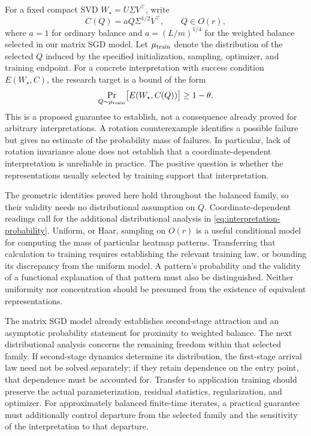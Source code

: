 For a fixed compact SVD $W_\star=U\Sigma V^\top$, write
\[
 C(Q)=aQ\Sigma^{1/2}V^\top,\qquad Q\in O(r),
\]
where $a=1$ for ordinary balance and $a=(L/m)^{1/4}$ for the weighted balance selected in our matrix SGD model. Let $\mu_{\rm train}$ denote the distribution of the selected $Q$ induced by the specified initialization, sampling, optimizer, and training endpoint. For a concrete interpretation with success condition $E(W_\star,C)$, the research target is a bound of the form
\begin{equation}\label{eq:interpretation-probability}
 \Pr_{Q\sim\mu_{\rm train}}
 \bigl[E(W_\star,C(Q))\bigr]\geq 1-\theta.
\end{equation}
This is a proposed guarantee to establish, not a consequence already proved for arbitrary interpretations. A rotation counterexample identifies a possible failure but gives no estimate of the probability mass of failures. In particular, lack of rotation invariance alone does not establish that a coordinate-dependent interpretation is unreliable in practice. The positive question is whether the representations usually selected by training support that interpretation.

The geometric identities proved here hold throughout the balanced family, so their validity needs no distributional assumption on $Q$. Coordinate-dependent readings call for the additional distributional analysis in \eqref{eq:interpretation-probability}. Uniform, or Haar, sampling on $O(r)$ is a useful conditional model for computing the mass of particular heatmap patterns. Transferring that calculation to training requires establishing the relevant training law, or bounding its discrepancy from the uniform model. A pattern's probability and the validity of a functional explanation of that pattern must also be distinguished. Neither uniformity nor concentration should be presumed from the existence of equivalent representations.

The matrix SGD model already establishes second-stage attraction and an asymptotic probability statement for proximity to weighted balance. The next distributional analysis concerns the remaining freedom within that selected family. If second-stage dynamics determine its distribution, the first-stage arrival law need not be solved separately; if they retain dependence on the entry point, that dependence must be accounted for. Transfer to application training should preserve the actual parameterization, residual statistics, regularization, and optimizer. For approximately balanced finite-time iterates, a practical guarantee must additionally control departure from the selected family and the sensitivity of the interpretation to that departure.

